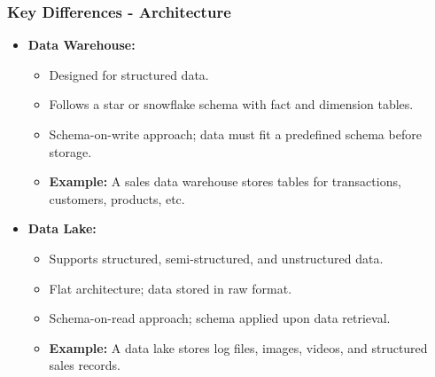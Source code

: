 \documentclass[aspectratio=169]{beamer}
\begin{document}
\begin{frame}[fragile]
    \frametitle{Key Differences - Architecture}
    \begin{itemize}
        \item \textbf{Data Warehouse:}
        \begin{itemize}
            \item Designed for structured data.
            \item Follows a star or snowflake schema with fact and dimension tables.
            \item Schema-on-write approach; data must fit a predefined schema before storage.
            \item \textbf{Example:} A sales data warehouse stores tables for transactions, customers, products, etc.
        \end{itemize}

        \item \textbf{Data Lake:}
        \begin{itemize}
            \item Supports structured, semi-structured, and unstructured data.
            \item Flat architecture; data stored in raw format.
            \item Schema-on-read approach; schema applied upon data retrieval.
            \item \textbf{Example:} A data lake stores log files, images, videos, and structured sales records.
        \end{itemize}
    \end{itemize}
\end{frame}
\end{document}
